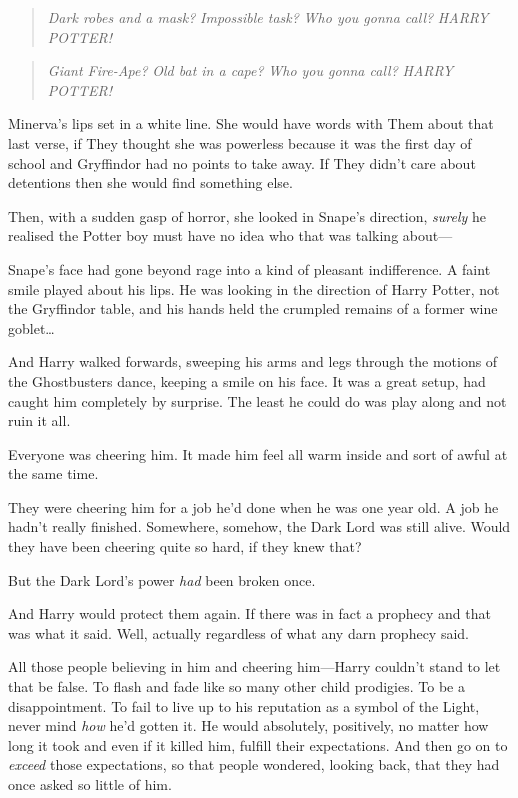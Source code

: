\begin{quote}
\emph{Dark robes and a mask?} \emph{Impossible task?} \emph{Who you
gonna call?} \emph{HARRY POTTER!}
\end{quote}

\begin{quote}
\emph{Giant Fire-Ape?} \emph{Old bat in a cape?} \emph{Who you gonna
call?} \emph{HARRY POTTER!}
\end{quote}

Minerva's lips set in a white line. She would have words with Them about
that last verse, if They thought she was powerless because it was the
first day of school and Gryffindor had no points to take away. If They
didn't care about detentions then she would find something else.

Then, with a sudden gasp of horror, she looked in Snape's direction,
\emph{surely} he realised the Potter boy must have no idea who that was
talking about---

Snape's face had gone beyond rage into a kind of pleasant indifference.
A faint smile played about his lips. He was looking in the direction of
Harry Potter, not the Gryffindor table, and his hands held the crumpled
remains of a former wine goblet\ldots{}

And Harry walked forwards, sweeping his arms and legs through the
motions of the Ghostbusters dance, keeping a smile on his face. It was a
great setup, had caught him completely by surprise. The least he could
do was play along and not ruin it all.

Everyone was cheering him. It made him feel all warm inside and sort of
awful at the same time.

They were cheering him for a job he'd done when he was one year old. A
job he hadn't really finished. Somewhere, somehow, the Dark Lord was
still alive. Would they have been cheering quite so hard, if they knew
that?

But the Dark Lord's power \emph{had} been broken once.

And Harry would protect them again. If there was in fact a prophecy and
that was what it said. Well, actually regardless of what any darn
prophecy said.

All those people believing in him and cheering him---Harry couldn't
stand to let that be false. To flash and fade like so many other child
prodigies. To be a disappointment. To fail to live up to his reputation
as a symbol of the Light, never mind \emph{how} he'd gotten it. He would
absolutely, positively, no matter how long it took and even if it killed
him, fulfill their expectations. And then go on to \emph{exceed} those
expectations, so that people wondered, looking back, that they had once
asked so little of him.

